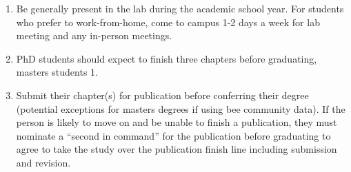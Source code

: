 \documentclass[12pt]{article}
\begin{document}
\begin{enumerate}
  fund yourself through grants from the conference and department.
\item Be generally present in the lab during the academic school
  year. For students who prefer to work-from-home, come to campus 1-2
  days a week for lab meeting and any in-person meetings. 
\item PhD students should expect to finish three chapters before
  graduating, masters students 1. 
\item Submit their chapter(s) for publication before conferring their
  degree (potential exceptions for masters degrees if using bee
  community data). If the person is likely to move on and be unable to
  finish a publication, they must nominate a ``second in command'' for
  the publication before graduating to agree to take the study over
  the publication finish line including submission and revision.
\end{enumerate}
\end{document}
